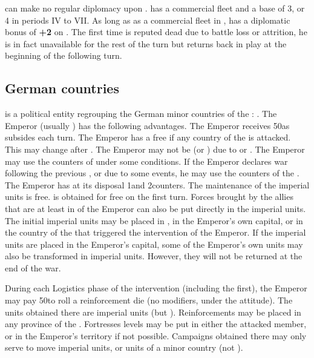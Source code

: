  \VEN can make no regular diplomacy upon
.
\aparag {} has a commercial fleet and a base \FTI of 3, or 4
in periods IV to VII.
\aparag As long as  as a commercial fleet in ,
\SPA has a diplomatic bonus of {\bf +2} on .
 The first time  is reputed dead
due to battle loss or attrition, he is in fact unavailable for the rest
of the turn but returns back in play at the beginning of the following
turn.

\subsection{German countries}

\label{chSpecific:HRE}
\aparag {} is a political entity regrouping the German
minor countries of the \HRE:
. The Emperor
(usually \HAB) has the following advantages.
\bparag The Emperor receives 50\ducats as subsides each turn.
\bparag The Emperor has a free \CB if any country of the \HRE is
attacked. This may change after .
\bparag The Emperor may not be \HAB (or \SPA) due to
 or .
The Emperor may use the counters of  under
some conditions.
If the Emperor declares war following the previous \CB, or due to some
events, he may use the counters of the . The Emperor
has at its disposal 1\ARMY and 2\LD counters.
The maintenance of the imperial units is free.
  \LD is obtained for free on the first turn.
\bparag Forces brought by the \HRE allies that are at least in \EW of
the Emperor can also be put directly in the imperial units.
 The initial imperial units may be placed
in , in the Emperor's own capital, or in the country
of the \HRE that triggered the intervention of the Emperor.
\bparag If the imperial units are placed in the Emperor's capital, some
of the Emperor's own units may also be transformed in imperial
units. However, they will not be returned at the end of the war.

\aparag[Reinforcements] During each Logistics phase of the intervention
(including the first), the Emperor may pay 50\ducats to roll a
reinforcement die (no modifiers, under the  attitude). The units
obtained there are imperial units (but ).
\bparag Reinforcements may be placed in any province of the \HRE.
\bparag Fortresses levels may be put in either the attacked \HRE member,
or in the Emperor's territory if not possible.
\bparag Campaigns obtained there may only serve to move imperial units,
or units of a \HRE minor country (not ).

